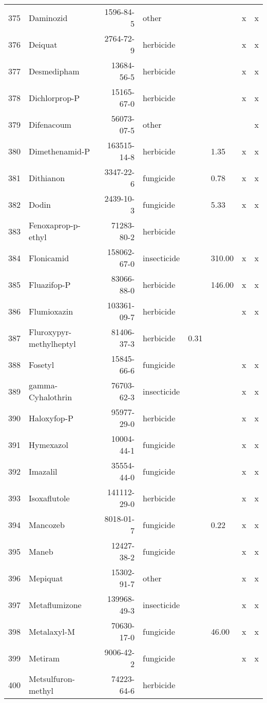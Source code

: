 \begin{longtable}{lp{4cm}rlp{1cm}p{1.5cm}p{1.5cm}p{1cm}}
  375 & Daminozid & 1596-84-5 & other &  &  & x & x \\ 
  376 & Deiquat & 2764-72-9 & herbicide &  &  & x & x \\ 
  377 & Desmedipham & 13684-56-5 & herbicide &  &  & x & x \\ 
  378 & Dichlorprop-P & 15165-67-0 & herbicide &  &  & x & x \\ 
  379 & Difenacoum & 56073-07-5 & other &  &  &  & x \\ 
  380 & Dimethenamid-P & 163515-14-8 & herbicide &  & 1.35 & x & x \\ 
  381 & Dithianon & 3347-22-6 & fungicide &  & 0.78 & x & x \\ 
  382 & Dodin & 2439-10-3 & fungicide &  & 5.33 & x & x \\ 
  383 & Fenoxaprop-p-ethyl & 71283-80-2 & herbicide &  &  &  &  \\ 
  384 & Flonicamid & 158062-67-0 & insecticide &  & 310.00 & x & x \\ 
  385 & Fluazifop-P & 83066-88-0 & herbicide &  & 146.00 & x & x \\ 
  386 & Flumioxazin & 103361-09-7 & herbicide &  &  & x & x \\ 
  387 & Fluroxypyr-methylheptyl & 81406-37-3 & herbicide & 0.31 &  &  &  \\ 
  388 & Fosetyl & 15845-66-6 & fungicide &  &  & x & x \\ 
  389 & gamma-Cyhalothrin & 76703-62-3 & insecticide &  &  & x & x \\ 
  390 & Haloxyfop-P & 95977-29-0 & herbicide &  &  & x & x \\ 
  391 & Hymexazol & 10004-44-1 & fungicide &  &  & x & x \\ 
  392 & Imazalil & 35554-44-0 & fungicide &  &  & x & x \\ 
  393 & Isoxaflutole & 141112-29-0 & herbicide &  &  & x & x \\ 
  394 & Mancozeb & 8018-01-7 & fungicide &  & 0.22 & x & x \\ 
  395 & Maneb & 12427-38-2 & fungicide &  &  & x & x \\ 
  396 & Mepiquat & 15302-91-7 & other &  &  & x & x \\ 
  397 & Metaflumizone & 139968-49-3 & insecticide &  &  & x & x \\ 
  398 & Metalaxyl-M & 70630-17-0 & fungicide &  & 46.00 & x & x \\ 
  399 & Metiram & 9006-42-2 & fungicide &  &  & x & x \\ 
  400 & Metsulfuron-methyl & 74223-64-6 & herbicide &  &  &  &  \\ 

\end{longtable}
